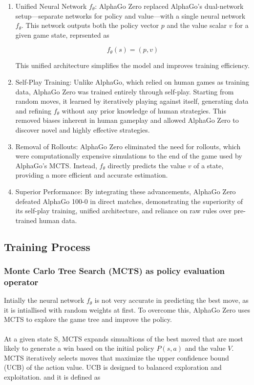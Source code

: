 \begin{enumerate}
    \item Unified Neural Network \( f_\theta \): AlphaGo Zero replaced AlphaGo's
          dual-network setup—separate networks for policy and value—with a single neural
          network \( f_\theta \). This network outputs both the policy vector \( p \) and
          the value scalar \( v \) for a given game state, reprsented as

          \begin{equation}
              f_\theta(s) = (p, v)
          \end{equation}

          This unified architecture simplifies the model and improves training
          efficiency.

    \item Self-Play Training: Unlike AlphaGo, which relied on human games as training
          data, AlphaGo Zero was trained entirely through self-play. Starting from random
          moves, it learned by iteratively playing against itself, generating data and
          refining \( f_\theta \) without any prior knowledge of human strategies. This
          removed biases inherent in human gameplay and allowed AlphaGo Zero to discover
          novel and highly effective strategies.

    \item Removal of Rollouts: AlphaGo Zero eliminated the need for rollouts, which were
          computationally expensive simulations to the end of the game used by AlphaGo's
          MCTS. Instead, \( f_\theta \) directly predicts the value \( v \) of a state,
          providing a more efficient and accurate estimation.

    \item Superior Performance: By integrating these advancements, AlphaGo Zero defeated
          AlphaGo 100-0 in direct matches, demonstrating the superiority of its self-play
          training, unified architecture, and reliance on raw rules over pre-trained
          human data.
\end{enumerate}

\subsection{Training Process}

\subsubsection{Monte Carlo Tree Search (MCTS) as policy evaluation operator}
Intially the neural network \( f_\theta \) is not very accurate in predicting
the best move, as it is intiallised with random weights at first. To overcome
this, AlphaGo Zero uses MCTS to explore the game tree and improve the policy.
\\\\ At a given state S, MCTS expands simualtions of the best moved that are
most likely to generate a win based on the initial policy $P(s,a)$ and the
value $V$. MCTS iteratively selects moves that maximize the upper confidence
bound (UCB) of the action value. UCB is designed to balanced exploration and
exploitation. and it is defined as

